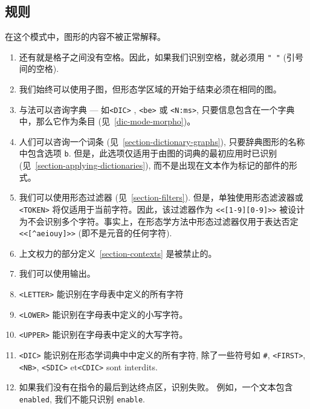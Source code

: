 \subsection{规则}
在这个模式中，图形的内容不被正常解释。
\begin{enumerate}
\item 还有就是格子之间没有空格。因此，如果我们识别空格，就必须用 \verb+" "+ (引号间的空格).

\item 我们始终可以使用子图，但形态学区域的开始于结束必须在相同的图。

\item 与法可以咨询字典
--- 如\verb+<DIC>+ , \verb+<be>+ 或 \verb+<N:ms>+, 
只要信息包含在一个字典中，那么它作为条目 (见~\ref{dic-mode-morpho})。
   
\item 人们可以咨询一个词条
(见~\ref{section-dictionary-graphs}), 只要辞典图形的名称中包含选项 \verb+b+.
但是，此选项仅适用于由图的词典的最初应用时已识别 (见~\ref{section-applying-dictionaries}),
而不是出现在文本作为标记的部件的形式。
   
\item 我们可以使用形态过滤器 (见~\ref{section-filters}). 但是，单独使用形态滤波器或\verb+<TOKEN>+
将仅适用于当前字符。因此，该过滤器作为 \verb+<<[1-9][0-9]>>+ 被设计为不会识别多个字符。事实上，在形态学方法中形态过滤器仅用于表达否定 \verb+<<[^aeiouy]>>+ (即不是元音的任何字符). 
   
\item 上文权力的部分定义~\ref{section-contexts} 是被禁止的。

\item 我们可以使用输出。
   
\item \verb+<LETTER>+ 能识别在字母表中定义的所有字符

\item \verb+<LOWER>+ 能识别在字母表中定义的小写字符。

\item \verb+<UPPER>+ 能识别在字母表中定义的大写字符。

\item \verb+<DIC>+ 能识别在形态学词典中中定义的所有字符, 除了一些符号如 \verb+#+, \verb+<FIRST>+,  \verb+<NB>+,
 	 \verb+<SDIC>+ et\verb+<CDIC>+ sont interdits.\index{\verb+#+}     
\item 
如果我们没有在指令的最后到达终点区，识别失败。
	例如，一个文本包含 \verb+enabled+, 我们不能只识别
	\verb+enable+.
\end{enumerate}

